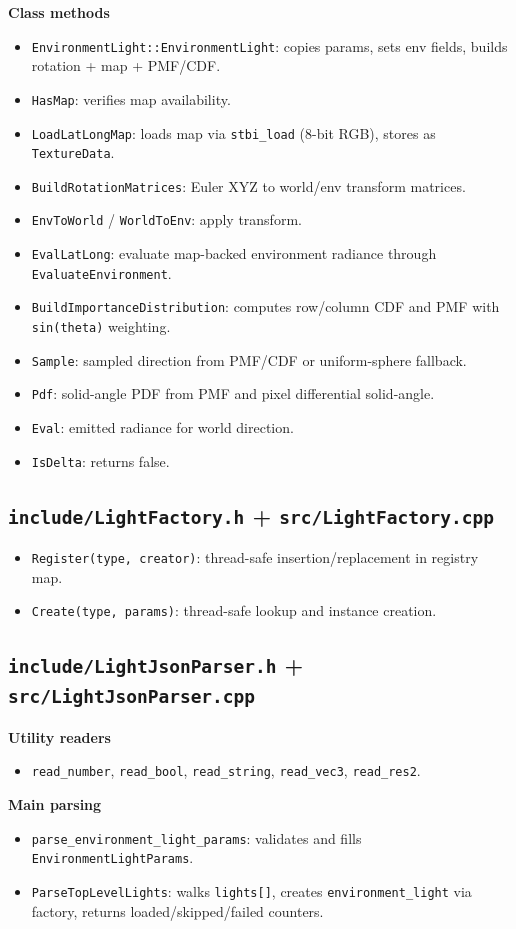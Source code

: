 \documentclass[11pt]{article}
\begin{document}
\textbf{Class methods}
\begin{itemize}[leftmargin=1.5em]
  \item \verb|EnvironmentLight::EnvironmentLight|: copies params, sets env fields, builds rotation + map + PMF/CDF.
  \item \verb|HasMap|: verifies map availability.
  \item \verb|LoadLatLongMap|: loads map via \verb|stbi_load| (8-bit RGB), stores as \verb|TextureData|.
  \item \verb|BuildRotationMatrices|: Euler XYZ to world/env transform matrices.
  \item \verb|EnvToWorld| / \verb|WorldToEnv|: apply transform.
  \item \verb|EvalLatLong|: evaluate map-backed environment radiance through \verb|EvaluateEnvironment|.
  \item \verb|BuildImportanceDistribution|: computes row/column CDF and PMF with \verb|sin(theta)| weighting.
  \item \verb|Sample|: sampled direction from PMF/CDF or uniform-sphere fallback.
  \item \verb|Pdf|: solid-angle PDF from PMF and pixel differential solid-angle.
  \item \verb|Eval|: emitted radiance for world direction.
  \item \verb|IsDelta|: returns false.
\end{itemize}

\subsection{\texttt{include/LightFactory.h} + \texttt{src/LightFactory.cpp}}
\begin{itemize}[leftmargin=1.5em]
  \item \verb|Register(type, creator)|: thread-safe insertion/replacement in registry map.
  \item \verb|Create(type, params)|: thread-safe lookup and instance creation.
\end{itemize}

\subsection{\texttt{include/LightJsonParser.h} + \texttt{src/LightJsonParser.cpp}}
\textbf{Utility readers}
\begin{itemize}[leftmargin=1.5em]
  \item \verb|read_number|, \verb|read_bool|, \verb|read_string|, \verb|read_vec3|, \verb|read_res2|.
\end{itemize}
\textbf{Main parsing}
\begin{itemize}[leftmargin=1.5em]
  \item \verb|parse_environment_light_params|: validates and fills \verb|EnvironmentLightParams|.
  \item \verb|ParseTopLevelLights|: walks \verb|lights[]|, creates \verb|environment_light| via factory, returns loaded/skipped/failed counters.
\end{itemize}
\end{document}
